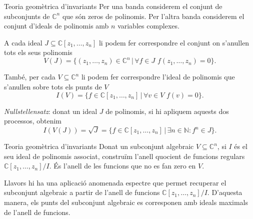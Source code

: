 \documentclass{beamer}
\theoremstyle{definition}
\begin{document}
\begin{frame}{Teoria geom\`{e}trica d'invariants}
Per una banda considerem el conjunt de subconjunts de $\mathbb{C}^n$ que s\'{o}n zeros de polinomis. Per l'altra banda considerem el conjunt d'ideals de polinomis amb $n$ variables complexes.
\pause

A cada ideal $J\subseteq\mathbb{C}[z_1,\ldots,z_n]$ li podem fer correspondre el conjunt on s'anul\textperiodcentered len tots els seus polinomis
\[V(J)=\{(z_1,\ldots,z_n)\in\mathbb{C}^n\,|\,\forall f\in J\,\,f(z_1,\ldots,z_n)=0\}.\]
\pause

Tamb\'{e}, per cada $V\subseteq\mathbb{C}^n$ li podem fer correspondre l'ideal de polinomis que s'anul\textperiodcentered len sobre tots els punts de $V$
\[I(V)=\{f\in\mathbb{C}[z_1,\ldots,z_n]\,|\,\forall v\in V\,\,f(v)=0\}.\]
\pause

\emph{Nullstellensatz}: donat un ideal $J$ de polinomis, si hi apliquem aquests dos processos, obtenim
\[I(V(J))=\sqrt{J}=\{f\in\mathbb{C}[z_1,\ldots,z_n]\,|\,\exists n\in\mathbb{N}:f^n\in J\}.\]
\end{frame}

\begin{frame}{Teoria geom\`{e}trica d'invariants}
Donat un subconjunt algebraic $V\subseteq\mathbb{C}^n$, si $I$ \'{e}s el seu ideal de polinomis associat, constru\"{i}m l'anell quocient de funcions regulars $\mathbb{C}[z_1,\ldots,z_n]/I$. \'{E}s l'anell de les funcions que no es fan zero en $V$.
\pause

Llavors hi ha una aplicaci\'{o} anomenada espectre que permet recuperar el subconjunt algebraic a partir de l'anell de funcions $\mathbb{C}[z_1,\ldots,z_n]/I$. D'aquesta manera, els punts del subconjunt algebraic es corresponen amb ideals maximals de l'anell de funcions.
\end{frame}
\end{document}
